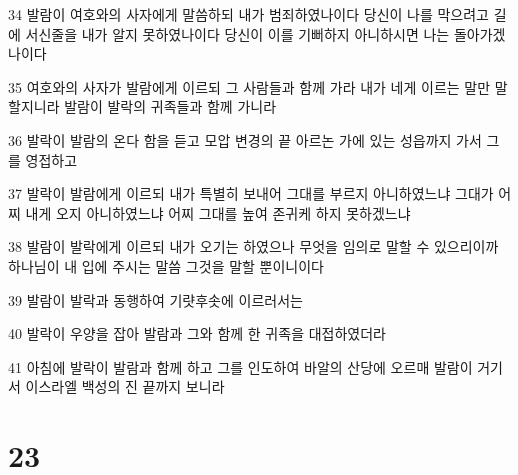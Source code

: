 \par 34 발람이 여호와의 사자에게 말씀하되 내가 범죄하였나이다 당신이 나를 막으려고 길에 서신줄을 내가 알지 못하였나이다 당신이 이를 기뻐하지 아니하시면 나는 돌아가겠나이다
\par 35 여호와의 사자가 발람에게 이르되 그 사람들과 함께 가라 내가 네게 이르는 말만 말할지니라 발람이 발락의 귀족들과 함께 가니라
\par 36 발락이 발람의 온다 함을 듣고 모압 변경의 끝 아르논 가에 있는 성읍까지 가서 그를 영접하고
\par 37 발락이 발람에게 이르되 내가 특별히 보내어 그대를 부르지 아니하였느냐 그대가 어찌 내게 오지 아니하였느냐 어찌 그대를 높여 존귀케 하지 못하겠느냐
\par 38 발람이 발락에게 이르되 내가 오기는 하였으나 무엇을 임의로 말할 수 있으리이까 하나님이 내 입에 주시는 말씀 그것을 말할 뿐이니이다
\par 39 발람이 발락과 동행하여 기럇후솟에 이르러서는
\par 40 발락이 우양을 잡아 발람과 그와 함께 한 귀족을 대접하였더라
\par 41 아침에 발락이 발람과 함께 하고 그를 인도하여 바알의 산당에 오르매 발람이 거기서 이스라엘 백성의 진 끝까지 보니라

\chapter{23}

